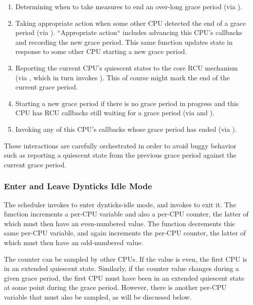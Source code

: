 \begin{enumerate}
\item	Determining when to take measures to end an over-long grace period
	(via ).
\item	Taking appropriate action when some other CPU detected the end of
	a grace period (via ).
	``Appropriate action`` includes advancing this CPU's
	callbacks and recording the new grace period.
	This same function updates state in response to some other
	CPU starting a new grace period.
\item	Reporting the current CPU's quiescent states to the core RCU
	mechanism (via , which
	in turn invokes ).
	This of course might mark the end of the current grace period.
\item	Starting a new grace period if there is no grace period in progress
	and this CPU has RCU callbacks still waiting for a grace period
	(via  and
	).
\item	Invoking any of this CPU's callbacks whose grace period has ended
	(via ).
\end{enumerate}

These interactions are carefully orchestrated in order to avoid
buggy behavior such as reporting a quiescent state from the previous
grace period against the current grace period.

\subsubsection{Enter and Leave Dynticks Idle Mode}
\label{app:rcuimpl:rcutree:Enter and Leave Dynticks Idle Mode}

The scheduler invokes  to
enter dynticks-idle mode, and invokes 
to exit it.
The  function increments a per-CPU
 variable and
also a per-CPU  counter, the latter of which must
then have an even-numbered value.
The  function decrements this same
per-CPU  variable,
and again increments the per-CPU 
counter, the latter of which must then have an odd-numbered value.

The  counter can be sampled by other CPUs.
If the value is even, the first CPU is in an extended quiescent state.
Similarly, if the counter value changes during a given grace period,
the first CPU must have been in an extended quiescent state at some
point during the grace period.
However, there is another  per-CPU variable
that must also be sampled, as will be discussed below.

